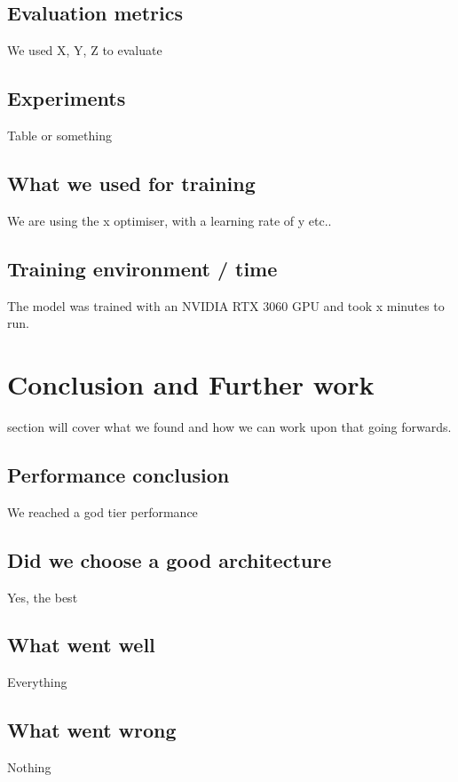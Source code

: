 \documentclass[journal]{./IEEEtran}
\begin{document}
	\subsection{Evaluation metrics}
	We used X, Y, Z to evaluate
	
	\subsection{Experiments}
	Table or something
	
	\subsection{What we used for training}
	We are using the x optimiser, with a learning rate of y etc..
	
	\subsection{Training environment / time}
	The model was trained with an NVIDIA RTX 3060 GPU and took x minutes to run.
	
	\section{Conclusion and Further work}
	 section will cover what we found and how we can work upon that going forwards.
	
	\subsection{Performance conclusion}
	We reached a god tier performance
	
	\subsection{Did we choose a good architecture}
	Yes, the best
	
	\subsection{What went well}
	Everything
	
	\subsection{What went wrong}
	Nothing
	
\end{document}
